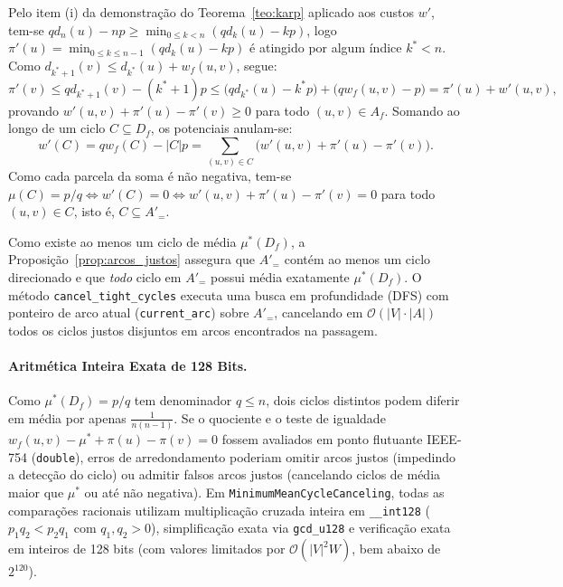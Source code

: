 \begin{demonstracao}
Pelo item (i) da demonstração do Teorema~\ref{teo:karp} aplicado aos custos $w'$, tem-se $q d_n(u) - np \ge \min_{0 \le k < n} (q d_k(u) - kp)$, logo $\pi'(u) = \min_{0 \le k \le n-1}(q d_k(u) - kp)$ é atingido por algum índice $k^* < n$. Como $d_{k^*+1}(v) \le d_{k^*}(u) + w_f(u,v)$, segue:
\begin{equation*}
    \pi'(v) \le q d_{k^*+1}(v) - (k^* + 1)p \le \bigl(q d_{k^*}(u) - k^* p\bigr) + \bigl(q w_f(u,v) - p\bigr) = \pi'(u) + w'(u,v),
\end{equation*}
provando $w'(u,v) + \pi'(u) - \pi'(v) \ge 0$ para todo $(u,v) \in A_f$. Somando ao longo de um ciclo $C \subseteq D_f$, os potenciais anulam-se:
\begin{equation*}
    w'(C) = q w_f(C) - |C|p = \sum_{(u,v) \in C} \bigl(w'(u,v) + \pi'(u) - \pi'(v)\bigr).
\end{equation*}
Como cada parcela da soma é não negativa, tem-se $\mu(C) = p/q \iff w'(C) = 0 \iff w'(u,v) + \pi'(u) - \pi'(v) = 0$ para todo $(u,v) \in C$, isto é, $C \subseteq A'_=$.
\end{demonstracao}

Como existe ao menos um ciclo de média $\mu^*(D_f)$, a Proposição~\ref{prop:arcos_justos} assegura que $A'_=$ contém ao menos um ciclo direcionado e que \emph{todo} ciclo em $A'_=$ possui média exatamente $\mu^*(D_f)$. O método \lstinline{cancel_tight_cycles} executa uma busca em profundidade (DFS) com ponteiro de arco atual (\lstinline{current_arc}) sobre $A'_=$, cancelando em $\mathcal{O}(|V| \cdot |A|)$ todos os ciclos justos disjuntos em arcos encontrados na passagem.

\paragraph{Aritmética Inteira Exata de 128 Bits.}
Como $\mu^*(D_f) = p/q$ tem denominador $q \le n$, dois ciclos distintos podem diferir em média por apenas $\frac{1}{n(n-1)}$. Se o quociente e o teste de igualdade $w_f(u,v) - \mu^* + \pi(u) - \pi(v) = 0$ fossem avaliados em ponto flutuante IEEE-754 (\lstinline{double}), erros de arredondamento poderiam omitir arcos justos (impedindo a detecção do ciclo) ou admitir falsos arcos justos (cancelando ciclos de média maior que $\mu^*$ ou até não negativa). Em \lstinline{MinimumMeanCycleCanceling}, todas as comparações racionais utilizam multiplicação cruzada inteira em \lstinline{__int128} ($p_1 q_2 < p_2 q_1$ com $q_1, q_2 > 0$), simplificação exata via \lstinline{gcd_u128} e verificação exata em inteiros de 128 bits (com valores limitados por $\mathcal{O}(|V|^2 W)$, bem abaixo de $2^{120}$).


